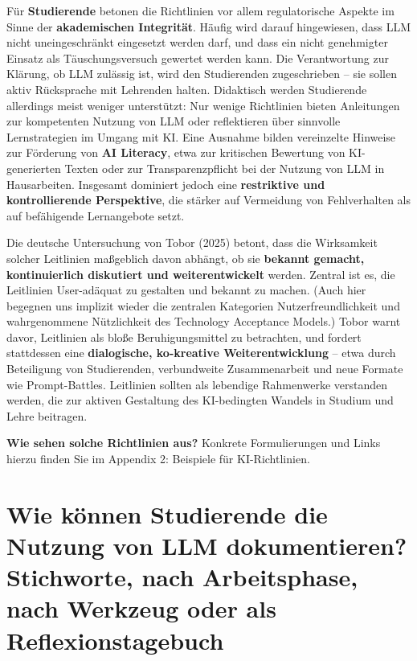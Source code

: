 \documentclass[
  ngerman,
  letterpaper,
  DIV=11]{scrreprt}
\begin{document}
Für \textbf{Studierende} betonen die Richtlinien vor allem
regulatorische Aspekte im Sinne der \textbf{akademischen Integrität}.
Häufig wird darauf hingewiesen, dass LLM nicht uneingeschränkt
eingesetzt werden darf, und dass ein nicht genehmigter Einsatz als
Täuschungsversuch gewertet werden kann. Die Verantwortung zur Klärung,
ob LLM zulässig ist, wird den Studierenden zugeschrieben -- sie sollen
aktiv Rücksprache mit Lehrenden halten. Didaktisch werden Studierende
allerdings meist weniger unterstützt: Nur wenige Richtlinien bieten
Anleitungen zur kompetenten Nutzung von LLM oder reflektieren über
sinnvolle Lernstrategien im Umgang mit KI. Eine Ausnahme bilden
vereinzelte Hinweise zur Förderung von \textbf{AI Literacy}, etwa zur
kritischen Bewertung von KI-generierten Texten oder zur
Transparenzpflicht bei der Nutzung von LLM in Hausarbeiten. Insgesamt
dominiert jedoch eine \textbf{restriktive und kontrollierende
Perspektive}, die stärker auf Vermeidung von Fehlverhalten als auf
befähigende Lernangebote setzt.

Die deutsche Untersuchung von Tobor (2025) betont, dass die Wirksamkeit
solcher Leitlinien maßgeblich davon abhängt, ob sie \textbf{bekannt
gemacht, kontinuierlich diskutiert und weiterentwickelt} werden. Zentral
ist es, die Leitlinien User-adäquat zu gestalten und bekannt zu machen.
(Auch hier begegnen uns implizit wieder die zentralen Kategorien
Nutzerfreundlichkeit und wahrgenommene Nützlichkeit des Technology
Acceptance Models.) Tobor warnt davor, Leitlinien als bloße
Beruhigungsmittel zu betrachten, und fordert stattdessen eine
\textbf{dialogische, ko-kreative Weiterentwicklung} -- etwa durch
Beteiligung von Studierenden, verbundweite Zusammenarbeit und neue
Formate wie Prompt-Battles. Leitlinien sollten als lebendige Rahmenwerke
verstanden werden, die zur aktiven Gestaltung des KI-bedingten Wandels
in Studium und Lehre beitragen.

\textbf{Wie sehen solche Richtlinien aus?} Konkrete Formulierungen und
Links hierzu finden Sie im Appendix 2: Beispiele für KI-Richtlinien.

\section{Wie können Studierende die Nutzung von LLM dokumentieren?
Stichworte, nach Arbeitsphase, nach Werkzeug oder als
Reflexionstagebuch}\label{wie-kuxf6nnen-studierende-die-nutzung-von-llm-dokumentieren-stichworte-nach-arbeitsphase-nach-werkzeug-oder-als-reflexionstagebuch}
\end{document}
